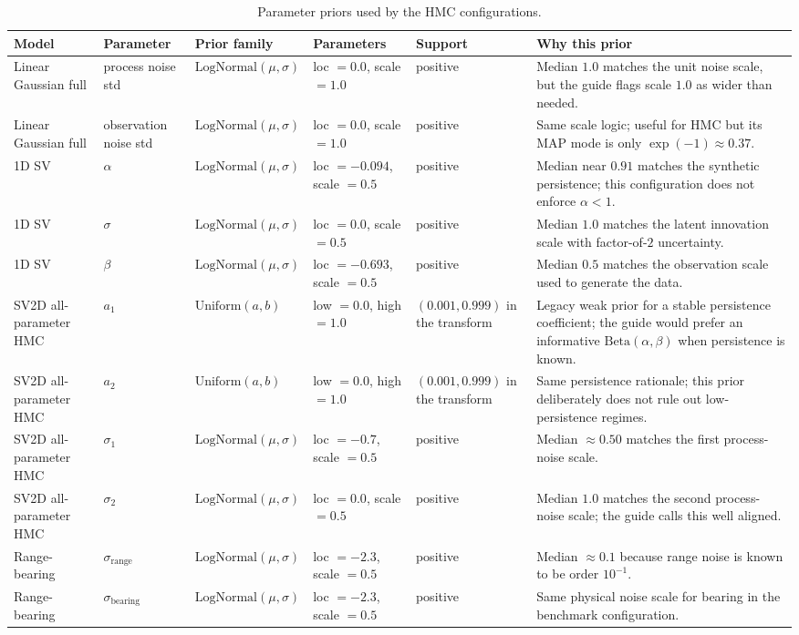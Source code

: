 \documentclass{article}
\begin{document}
\begin{table}[H]
\centering
\scriptsize
\caption{Parameter priors used by the HMC configurations.}
\label{tab:param-priors}
\begin{tabular}{p{2.4cm}p{2.4cm}p{2.5cm}p{2.1cm}p{2.0cm}p{3.4cm}}
\toprule
Model & Parameter & Prior family & Parameters & Support & Why this prior \\
\midrule
Linear Gaussian full & process noise std & $\mathrm{LogNormal}(\mu,\sigma)$ & loc $=0.0$, scale $=1.0$ & positive & Median $1.0$ matches the unit noise scale, but the guide flags scale $1.0$ as wider than needed. \\
Linear Gaussian full & observation noise std & $\mathrm{LogNormal}(\mu,\sigma)$ & loc $=0.0$, scale $=1.0$ & positive & Same scale logic; useful for HMC but its MAP mode is only $\exp(-1)\approx0.37$. \\
1D SV & $\alpha$ & $\mathrm{LogNormal}(\mu,\sigma)$ & loc $=-0.094$, scale $=0.5$ & positive & Median near $0.91$ matches the synthetic persistence; this configuration does not enforce $\alpha<1$. \\
1D SV & $\sigma$ & $\mathrm{LogNormal}(\mu,\sigma)$ & loc $=0.0$, scale $=0.5$ & positive & Median $1.0$ matches the latent innovation scale with factor-of-$2$ uncertainty. \\
1D SV & $\beta$ & $\mathrm{LogNormal}(\mu,\sigma)$ & loc $=-0.693$, scale $=0.5$ & positive & Median $0.5$ matches the observation scale used to generate the data. \\
SV2D all-parameter HMC & $a_1$ & $\mathrm{Uniform}(a,b)$ & low $=0.0$, high $=1.0$ & $(0.001,0.999)$ in the transform & Legacy weak prior for a stable persistence coefficient; the guide would prefer an informative $\mathrm{Beta}(\alpha,\beta)$ when persistence is known. \\
SV2D all-parameter HMC & $a_2$ & $\mathrm{Uniform}(a,b)$ & low $=0.0$, high $=1.0$ & $(0.001,0.999)$ in the transform & Same persistence rationale; this prior deliberately does not rule out low-persistence regimes. \\
SV2D all-parameter HMC & $\sigma_1$ & $\mathrm{LogNormal}(\mu,\sigma)$ & loc $=-0.7$, scale $=0.5$ & positive & Median $\approx0.50$ matches the first process-noise scale. \\
SV2D all-parameter HMC & $\sigma_2$ & $\mathrm{LogNormal}(\mu,\sigma)$ & loc $=0.0$, scale $=0.5$ & positive & Median $1.0$ matches the second process-noise scale; the guide calls this well aligned. \\
Range-bearing & $\sigma_{\mathrm{range}}$ & $\mathrm{LogNormal}(\mu,\sigma)$ & loc $=-2.3$, scale $=0.5$ & positive & Median $\approx0.1$ because range noise is known to be order $10^{-1}$. \\
Range-bearing & $\sigma_{\mathrm{bearing}}$ & $\mathrm{LogNormal}(\mu,\sigma)$ & loc $=-2.3$, scale $=0.5$ & positive & Same physical noise scale for bearing in the benchmark configuration. \\
\bottomrule
\end{tabular}
\end{table}
\end{document}
